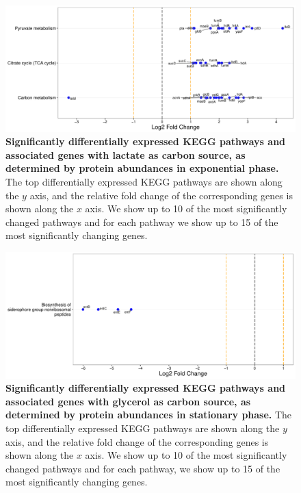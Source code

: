 \documentclass[a4paper]{article}
\begin{document}
\clearpage
\begin{figure}
	\includegraphics[width=1.0\textwidth]{../../d_figures/kegg_05.pdf}
	\caption[Significantly differentially expressed KEGG pathways for protein samples in exponential phase tested for lactate against glucose]
	{\textbf{Significantly differentially expressed KEGG pathways and associated genes with lactate as carbon source, as determined by protein abundances in exponential phase.} The top differentially expressed KEGG pathways are shown along the $y$ axis, and the relative fold change of the corresponding genes is shown along the $x$ axis. We show up to 10 of the most significantly changed pathways and for each pathway we show up to 15 of the most significantly changing genes.}
\end{figure}

\clearpage
\begin{figure}
	\includegraphics[width=1.0\textwidth]{../../d_figures/kegg_06.pdf}
	\caption[Significantly differentially expressed KEGG pathways for protein samples in stationary phase tested for glycerol against glucose]
	{\textbf{Significantly differentially expressed KEGG pathways and associated genes with glycerol as carbon source, as determined by protein abundances in stationary phase.} The top differentially expressed KEGG pathways are shown along the $y$ axis, and the relative fold change of the corresponding genes is shown along the $x$ axis. We show up to 10 of the most significantly changed pathways and for each pathway, we show up to 15 of the most significantly changing genes.}
\end{figure}
\end{document}

